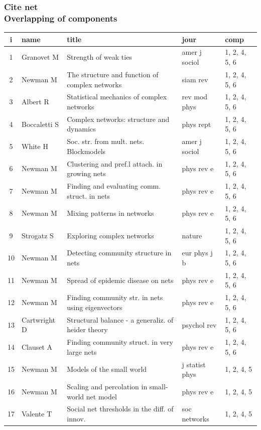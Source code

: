 \documentclass[hyperref={pdfstartview={FitBH -32768},
                         pdfpagemode=FullScreen,
                         plainpages=false,
                         colorlinks=true}
              ]{beamer}
\begin{document}
\begin{frame}[fragile]
\frametitle{Cite net\\ \normalsize Overlapping of components}
\small

\renewcommand{\arraystretch}{0.2}
\tiny
\begin{tabular}{c|l|l|l|l|}
i&   	name & title & jour & comp \\ \hline 
1&   	Granovet M &   	 Strength of weak ties&   	amer j sociol&   	1, 2, 4, 5, 6\\
2&   	Newman M&   	 The structure and function of complex networks&   	siam rev&   	1, 2, 4, 5, 6\\
3&   	Albert R&   	 Statistical mechanics of complex networks&   	rev mod phys&   	1, 2, 4, 5, 6\\
4&   	Boccaletti S&   	 Complex networks: structure and dynamics&   	phys rept&   	1, 2, 4, 5, 6\\
5&   	White H&   	 Soc. str. from mult. nets. Blockmodels &   	amer j sociol&   	1, 2, 4, 5, 6\\
6&   	Newman M&   	 Clustering and pref.l attach. in growing nets&   	phys rev e&   	1, 2, 4, 5, 6\\
7&   	Newman M&   	 Finding and evaluating comm. struct. in nets&   	phys rev e&   	1, 2, 4, 5, 6\\
8&   	Newman M&   	 Mixing patterns in networks&   	phys rev e&   	1, 2, 4, 5, 6\\
9&   	Strogatz S&   	 Exploring complex networks&   	nature&   	1, 2, 4, 5, 6\\
10&   	Newman M&   	 Detecting community structure in nets&   	eur phys j b&   	1, 2, 4, 5, 6\\
11&   	Newman M&   	 Spread of epidemic disease on nets&   	phys rev e&   	1, 2, 4, 5, 6\\
12&   	Newman M&   	 Finding community str. in nets using eigenvectors &   	phys rev e&   	1, 2, 4, 5, 6\\
13&   	Cartwright D&   	 Structural balance - a generaliz. of heider theory&   	psychol rev&   	1, 2, 4, 5, 6\\
14&   	Clauset A&   	 Finding community struct. in very large nets&   	phys rev e&   	1, 2, 4, 5, 6\\
15&   	Newman M&   	 Models of the small world&   	j statist phys&   	1, 2, 4, 5\\
16&   	Newman M&   	 Scaling and percolation in small-world net model&   	phys rev e&   	1, 2, 4, 5\\
17&   	Valente T&   	 Social net thresholds in the diff. of innov.&   	soc networks&   	1, 2, 4, 5\\

\end{tabular}
\end{frame}
\end{document}
